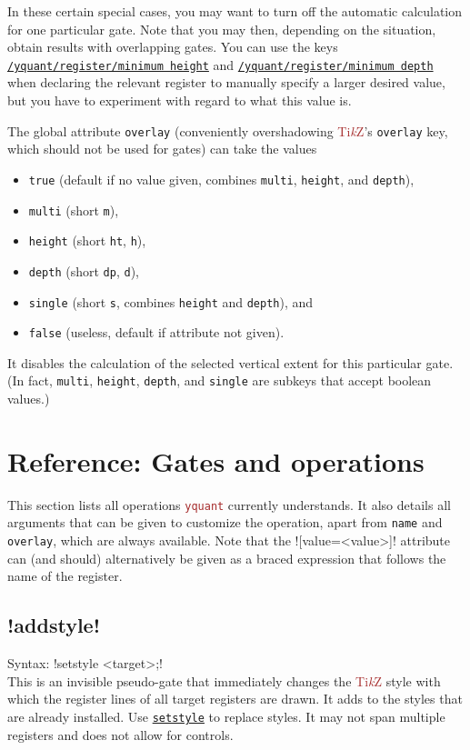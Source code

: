\documentclass{scrartcl}
\makeatletter
\def\TikZ{\textcolor{brown}{Ti\textit kZ}}
\def\pkg#1{\textcolor{brown}{\texttt{#1}}}
\def\gate#1{\hyperref[gate:#1]{\texttt{#1}}}
\def\style#1{\hyperref[style:#1]{\texttt{#1}}}
\def\Yquant{\pkg{yquant}}
\newcommand*{\the@orig@section}{}
\let\the@orig@section=\section
\renewcommand*{\section}{%
   \clearpage%
   \the@orig@section%
}
\makeatother
\begin{document}
         In these certain special cases, you may want to turn off the automatic calculation for one particular gate.
         Note that you may then, depending on the situation, obtain results with overlapping gates.
         You can use the keys \style{/yquant/register/minimum height} and \style{/yquant/register/minimum depth} when declaring the relevant register to manually specify a larger desired value, but you have to experiment with regard to what this value is.

         The global attribute \texttt{overlay} (conveniently overshadowing \TikZ's \texttt{overlay} key, which should not be used for gates) can take the values
         \begin{itemize}
            \item \texttt{true} (default if no value given, combines \texttt{multi}, \texttt{height}, and \texttt{depth}),
            \item \texttt{multi} (short \texttt{m}),
            \item \texttt{height} (short \texttt{ht}, \texttt{h}),
            \item \texttt{depth} (short \texttt{dp}, \texttt{d}),
            \item \texttt{single} (short \texttt{s}, combines \texttt{height} and \texttt{depth}), and
            \item \texttt{false} (useless, default if attribute not given).
         \end{itemize}
         It disables the calculation of the selected vertical extent for this particular gate.
         (In fact, \texttt{multi}, \texttt{height}, \texttt{depth}, and \texttt{single} are subkeys that accept boolean values.)

   \section{Reference: Gates and operations}\label{sec:gates}
      This section lists all operations \Yquant{} currently understands.
      It also details all arguments that can be given to customize the operation, apart from \texttt{name} and \texttt{overlay}, which are always available.
      Note that the \tex![value=<value>]! attribute can (and should) alternatively be given as a braced expression that follows the name of the register.

      \subsection[\texorpdfstring{\yquant!addstyle!}{addstyle}]{\yquant!addstyle!}\label{gate:addstyle}
         Syntax: \yquant!setstyle <target>;! \\
         This is an invisible pseudo\hyp gate that immediately changes the \TikZ{} style with which the register lines of all target registers are drawn.
         It adds to the styles that are already installed.
         Use \gate{setstyle} to replace styles.
         It may not span multiple registers and does not allow for controls.
\end{document}

